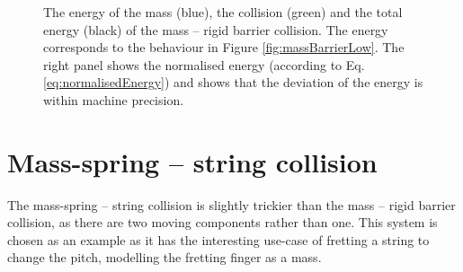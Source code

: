 \begin{figure}[h]
    \centering
      \caption{The energy of the mass (blue), the collision (green) and the total energy (black) of the mass -- rigid barrier collision. The energy corresponds to the behaviour in Figure \ref{fig:massBarrierLow}. The right panel shows the normalised energy (according to Eq. \eqref{eq:normalisedEnergy}) and shows that the deviation of the energy is within machine precision. \label{fig:massBarrierEnergy}}
\end{figure}

\section{Mass-spring -- string collision}\label{sec:massString}
The mass-spring -- string collision is slightly trickier than the mass -- rigid barrier collision, as there are two moving components rather than one. This system is chosen as an example as it has the interesting use-case of fretting a string to change the pitch, modelling the fretting finger as a mass.

